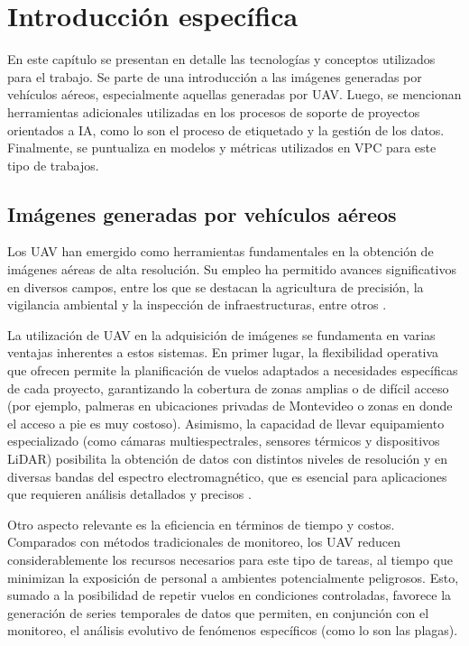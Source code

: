 \chapter{Introducción específica}
\label{Chapter2}

En este capítulo se presentan en detalle las tecnologías y conceptos utilizados para el trabajo. Se parte de una introducción a las imágenes generadas por vehículos aéreos, especialmente aquellas generadas por UAV. Luego, se mencionan herramientas adicionales utilizadas en los procesos de soporte de proyectos orientados a IA, como lo son el proceso de etiquetado y la gestión de los datos. Finalmente, se puntualiza en modelos y métricas utilizados en VPC para este tipo de trabajos.

\section{Imágenes generadas por vehículos aéreos}
\label{sec:imgGenVehiculosAereos}

Los UAV han emergido como herramientas fundamentales en la obtención de imágenes aéreas de alta resolución. Su empleo ha permitido avances significativos en diversos campos, entre los que se destacan la agricultura de precisión, la vigilancia ambiental y la inspección de infraestructuras, entre otros \citep{mokhtar_image_2023}.

La utilización de UAV en la adquisición de imágenes se fundamenta en varias ventajas inherentes a estos sistemas. En primer lugar, la flexibilidad operativa que ofrecen permite la planificación de vuelos adaptados a necesidades específicas de cada proyecto, garantizando la cobertura de zonas amplias o de difícil acceso (por ejemplo, palmeras en ubicaciones privadas de Montevideo o zonas en donde el acceso a pie es muy costoso). Asimismo, la capacidad de llevar equipamiento especializado (como cámaras multiespectrales, sensores térmicos y dispositivos LiDAR) posibilita la obtención de datos con distintos niveles de resolución y en diversas bandas del espectro electromagnético, que es esencial para aplicaciones que requieren análisis detallados y precisos \citep{unmanned_system_technology_uavdrone_nodate}.

Otro aspecto relevante es la eficiencia en términos de tiempo y costos. Comparados con métodos tradicionales de monitoreo, los UAV reducen considerablemente los recursos necesarios para este tipo de tareas, al tiempo que minimizan la exposición de personal a ambientes potencialmente peligrosos. Esto, sumado a la posibilidad de repetir vuelos en condiciones controladas, favorece la generación de series temporales de datos que permiten, en conjunción con el monitoreo, el análisis evolutivo de fenómenos específicos (como lo son las plagas).

